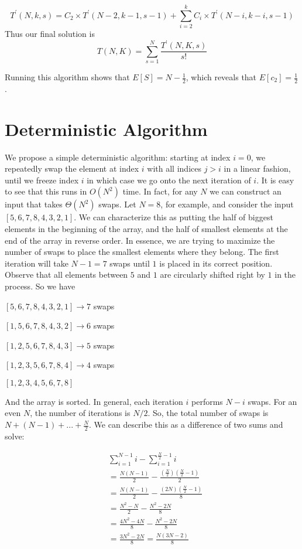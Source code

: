 \documentclass{article}
\begin{document}
\[ T^\prime(N, k, s) =
C_2 \times T^\prime(N - 2, k - 1, s-1) +
\sum_{i = 2}^{k}{C_i \times T^\prime(N-i, k-i, s-1)} \]
Thus our final solution is
\[ T(N, K) = \sum_{s = 1}^{N}{\frac{T^\prime(N, K, s)}{s!}} \]

Running this algorithm shows that $E[S] = N - \frac{1}{2}$, which reveals that $E[c_2] = \frac{1}{2}$.

\section{Deterministic Algorithm}
We propose a simple deterministic algorithm: starting at index $i = 0$, we repeatedly swap the element
at index $i$ with all indices $j > i$ in a linear fashion, until we freeze index $i$ in which case we go onto the 
next iteration of $i$. It is easy to see that this runs in $O(N^2)$ time. In fact, for any $N$ we can construct an input
that takes $\Theta(N^2)$ swaps. Let $N = 8$, for example, and consider the input $[5, 6, 7, 8, 4, 3, 2, 1]$.
We can characterize this as putting the half of biggest elements in the beginning of the array, and the half of smallest elements at
the end of the array in reverse order. In essence, we are trying to maximize the number of swaps to place the smallest
elements where they belong.
The first iteration will take $N - 1 = 7$ swaps until $1$ is placed in its correct position. Observe that all elements
between $5$ and $1$ are circularly shifted right by $1$ in the process. So we have

$[5, 6, 7, 8, 4, 3, 2, 1] \rightarrow 7$ swaps

$[1, 5, 6, 7, 8, 4, 3, 2] \rightarrow 6$ swaps

$[1, 2, 5, 6, 7, 8, 4, 3] \rightarrow 5$ swaps

$[1, 2, 3, 5, 6, 7, 8, 4] \rightarrow 4$ swaps

$[1, 2, 3, 4, 5, 6, 7, 8]$

And the array is sorted. In general, each iteration $i$ performs $N - i$ swaps.
For an even $N$, the number of iterations is $N / 2$. So, the total number of swaps is
$N + (N - 1) + ... + \frac{N}{2}$. We can describe this as a difference of two sums and solve:

\begin{align}
    & \sum_{i = 1}^{N - 1}{i} - \sum_{i = 1}^{\frac{N}{2} - 1}{i}  \\\nonumber
    &= \frac{N(N-1)}{2} - \frac{(\frac{N}{2})(\frac{N}{2} - 1)}{2} \\\nonumber
    &= \frac{N(N-1)}{2} - \frac{(2N)(\frac{N}{2} - 1)}{8} \\\nonumber
    &= \frac{N^2 - N}{2} - \frac{N^2 - 2N}{8} \\\nonumber
    &= \frac{4N^2 - 4N}{8} - \frac{N^2 - 2N}{8} \\\nonumber
    &= \frac{3N^2 - 2N}{8} = \frac{N(3N - 2)}{8} \\\nonumber
\end{align}
\end{document}
